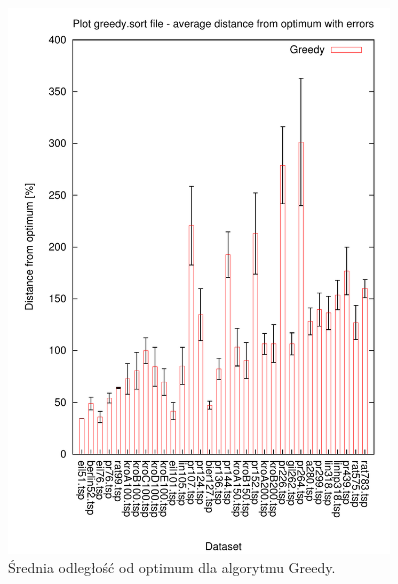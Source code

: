 \begin{figure}
\begin{center}
\includegraphics[width=0.9\textwidth]{wykresy/greedy_av_sort}
\end{center}
\caption{Średnia odległość od optimum dla algorytmu Greedy.}
\label{greedy_av_sort}
\end{figure}


